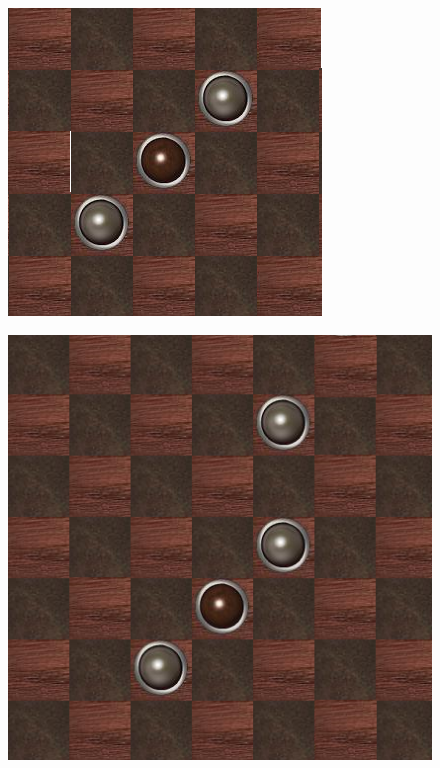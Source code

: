 \documentclass[11pt]{article} %
\begin{document}
\begin{figure}[!htb]
{	\label{paysage}
	}
\endminipage\hfill
{}
	\caption{  }
	\label{fig_sim}
	{
	\includegraphics[width=\linewidth]{3}
	\label{paysage}
	}
\endminipage\hfill
{}
	\caption{  }
	\label{fig_sim}
	{
	\includegraphics[width=\linewidth]{4}
	\label{paysage}
	}
\endminipage
\end{figure}
\end{document}
